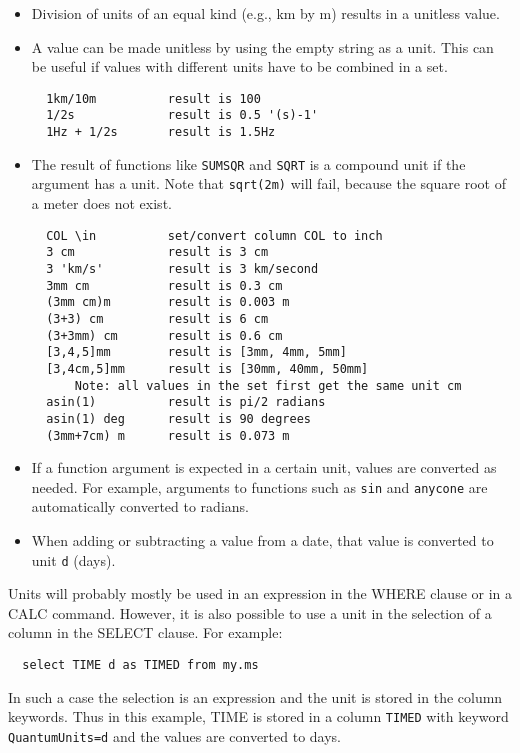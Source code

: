 \begin{itemize}
	days, so it could be compared with a given date/time.
	So, for backward compatibility, a division of a value with
	unit \texttt{s} by a constant 86400 results in unit \texttt{d}.
 \item Division of units of an equal kind (e.g., km by m) results in a
   unitless value.
\item A value can be made unitless by using the empty string as a
  unit. This can be useful if values with different units have to be
  combined in a set.
\begin{verbatim}
  1km/10m          result is 100
  1/2s             result is 0.5 '(s)-1'
  1Hz + 1/2s       result is 1.5Hz
\end{verbatim}
 \item The result of functions like \texttt{SUMSQR} and \texttt{SQRT} is a
	compound unit if the argument has a unit.
	Note that \texttt{sqrt(2m)} will fail, because the square root
	of a meter does not exist.
 \begin{verbatim}
  COL \in          set/convert column COL to inch
  3 cm             result is 3 cm
  3 'km/s'         result is 3 km/second
  3mm cm           result is 0.3 cm
  (3mm cm)m        result is 0.003 m
  (3+3) cm         result is 6 cm
  (3+3mm) cm       result is 0.6 cm
  [3,4,5]mm        result is [3mm, 4mm, 5mm]
  [3,4cm,5]mm      result is [30mm, 40mm, 50mm]
      Note: all values in the set first get the same unit cm
  asin(1)          result is pi/2 radians
  asin(1) deg      result is 90 degrees
  (3mm+7cm) m      result is 0.073 m
\end{verbatim}
 \item If a function argument is expected in a certain unit, values
	are converted as needed. For example, arguments to functions 
	such as \texttt{sin} and \texttt{anycone}
	are automatically converted to radians.
 \item When adding or subtracting a value from a date, that value is
	converted to unit \texttt{d} (days).
\end{itemize}
Units will probably mostly be used in an expression in the WHERE
clause or in a CALC command. However, it is also possible to use a
unit in the selection of a column in the SELECT clause. For example:
\begin{verbatim}
  select TIME d as TIMED from my.ms
\end{verbatim}
In such a case the selection is an expression and the unit is stored
in the column keywords. Thus in this example, TIME is stored in a
column \texttt{TIMED} with keyword \texttt{QuantumUnits=d} and the 
values are converted to days.

